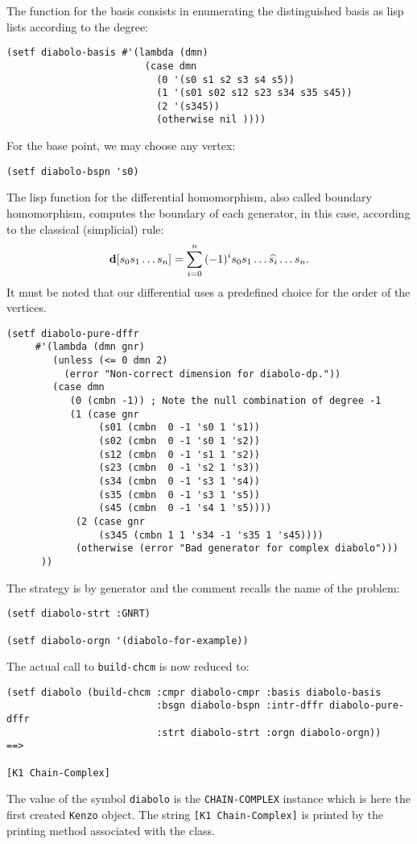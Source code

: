 The function for the basis consists  in enumerating the distinguished basis as lisp lists
according to the degree:
{\footnotesize\begin{verbatim}
(setf diabolo-basis #'(lambda (dmn)
                        (case dmn
                          (0 '(s0 s1 s2 s3 s4 s5))
                          (1 '(s01 s02 s12 s23 s34 s35 s45))
                          (2 '(s345))
                          (otherwise nil ))))
\end{verbatim}}
For the base point, we may choose any vertex:
{\footnotesize\begin{verbatim}
(setf diabolo-bspn 's0)
\end{verbatim}}
The lisp function for the differential homomorphism, also called boundary homomorphism,
computes the boundary of each generator, in this case,  according to the classical (simplicial) rule:
$$ {\bf d}[{s_0s_1\ldots s_n}] = \sum_{i=0}^n{(-1)^is_0s_1\ldots\widehat{s_i}\ldots s_n}.$$
It must be noted that our differential uses a predefined choice for the order of the vertices.
{\footnotesize\begin{verbatim}
(setf diabolo-pure-dffr
     #'(lambda (dmn gnr)
        (unless (<= 0 dmn 2)
          (error "Non-correct dimension for diabolo-dp."))
        (case dmn
           (0 (cmbn -1)) ; Note the null combination of degree -1
           (1 (case gnr
                (s01 (cmbn  0 -1 's0 1 's1))
                (s02 (cmbn  0 -1 's0 1 's2))
                (s12 (cmbn  0 -1 's1 1 's2))
                (s23 (cmbn  0 -1 's2 1 's3))
                (s34 (cmbn  0 -1 's3 1 's4))
                (s35 (cmbn  0 -1 's3 1 's5))
                (s45 (cmbn  0 -1 's4 1 's5))))
            (2 (case gnr
                (s345 (cmbn 1 1 's34 -1 's35 1 's45))))
            (otherwise (error "Bad generator for complex diabolo")))
      ))
\end{verbatim}}
The  strategy is by generator and the comment recalls the name of the problem:
{\footnotesize\begin{verbatim}
(setf diabolo-strt :GNRT)

(setf diabolo-orgn '(diabolo-for-example))
\end{verbatim}}
The actual call to {\tt build-chcm} is now reduced to:
{\footnotesize\begin{verbatim}
(setf diabolo (build-chcm :cmpr diabolo-cmpr :basis diabolo-basis
                          :bsgn diabolo-bspn :intr-dffr diabolo-pure-dffr
                          :strt diabolo-strt :orgn diabolo-orgn))       ==>

[K1 Chain-Complex]
\end{verbatim}}
The value of the symbol {\tt diabolo} is the {\tt CHAIN-COMPLEX}  instance which is here the first
created {\tt Kenzo} object. The string {\tt [K1 Chain-Complex]}
is printed by the printing method associated with the class.


